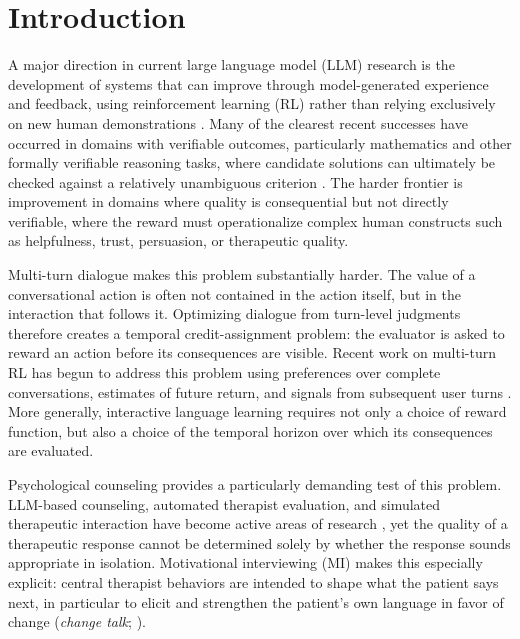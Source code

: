 \section{Introduction}
\label{sec:intro}

A major direction in current large language model (LLM) research is the development of systems that can improve through model-generated experience and feedback, using reinforcement learning (RL) rather than relying exclusively on new human demonstrations \citep{yuan2024selfrewarding,guo2025deepseekr1}.
Many of the clearest recent successes have occurred in domains with verifiable outcomes, particularly mathematics and other formally verifiable reasoning tasks, where candidate solutions can ultimately be checked against a relatively unambiguous criterion \citep{shao2024deepseekmath,guo2025deepseekr1}.
The harder frontier is improvement in domains where quality is consequential but not directly verifiable, where the reward must operationalize complex human constructs such as helpfulness, trust, persuasion, or therapeutic quality.

Multi-turn dialogue makes this problem substantially harder. The value of a conversational action is often not contained in the action itself, but in the interaction that follows it. Optimizing dialogue from turn-level judgments therefore creates a temporal credit-assignment problem: the evaluator is asked to reward an action before its consequences are visible. Recent work on multi-turn RL has begun to address this problem using preferences over complete conversations, estimates of future return, and signals from subsequent user turns \citep{shani2024multiturn,gao2024refuel,zhao2026faca}. More generally, interactive language learning requires not only a choice of reward function, but also a choice of the temporal horizon over which its consequences are evaluated.

Psychological counseling provides a particularly demanding test of this problem. LLM-based counseling, automated therapist evaluation, and simulated therapeutic interaction have become active areas of research \citep{chiu2024bolt,yosef2024assessing,yang2026mithinker}, yet the quality of a therapeutic response cannot be determined solely by whether the response sounds appropriate in isolation. Motivational interviewing (MI) makes this especially explicit: central therapist behaviors are intended to shape what the patient says next, in particular to elicit and strengthen the patient's own language in favor of change (\emph{change talk}; \citealp{miller2013mi,moyers2016miti}).

